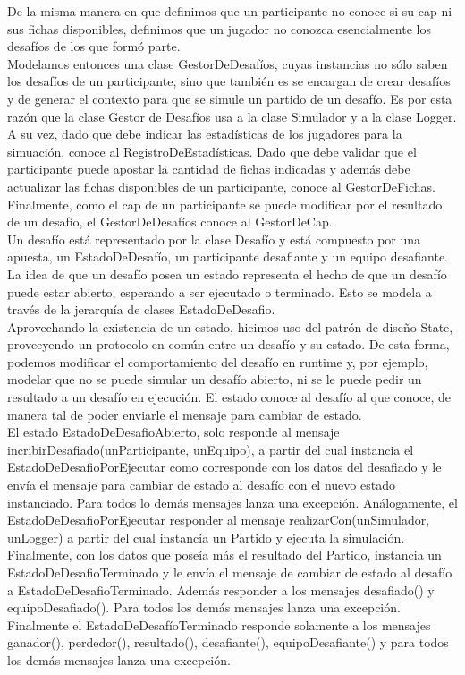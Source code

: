 De la misma manera en que definimos que un participante no conoce si su cap ni sus fichas disponibles, definimos que un jugador no conozca esencialmente los desafíos de los que formó parte.\\
Modelamos entonces una clase GestorDeDesafíos, cuyas instancias no sólo saben los desafíos de un participante, sino que también es se encargan de crear desafíos y de generar el contexto para que se simule un partido de un desafío. Es por esta razón que la clase Gestor de Desafíos usa a la clase Simulador y a la clase Logger.
A su vez, dado que debe indicar las estadísticas de los jugadores para la simuación, conoce al RegistroDeEstadísticas. Dado que debe validar que el participante puede apostar la cantidad de fichas indicadas y además debe actualizar las fichas disponibles de un participante, conoce al GestorDeFichas. Finalmente, como el cap de un participante se puede modificar por el resultado de un desafío, el GestorDeDesafíos conoce al GestorDeCap.\\

Un desafío está representado por la clase Desafío y está compuesto por una apuesta, un EstadoDeDesafío, un participante desafiante y un equipo desafiante.\\
La idea de que un desafío posea un estado representa el hecho de que un desafío puede estar abierto, esperando a ser ejecutado o terminado. Esto se modela a través de la jerarquía de clases EstadoDeDesafio.\\
Aprovechando la existencia de un estado, hicimos uso del patrón de diseño State, proveeyendo un protocolo en común entre un desafío y su estado. De esta forma, podemos modificar el comportamiento del desafío en runtime y, por ejemplo, modelar que no se puede simular un desafío abierto, ni se le puede pedir un resultado a un desafío en ejecución. El estado conoce al desafío al que conoce, de manera tal de poder enviarle el mensaje para cambiar de estado.\\
El estado EstadoDeDesafioAbierto, solo responde al mensaje incribirDesafiado(unParticipante, unEquipo), a partir del cual instancia el EstadoDeDesafioPorEjecutar como corresponde con los datos del desafiado y le envía el mensaje para cambiar de estado al desafío con el nuevo estado instanciado. Para todos lo demás mensajes lanza una excepción.
Análogamente, el EstadoDeDesafioPorEjecutar responder al mensaje realizarCon(unSimulador, unLogger) a partir del cual instancia un Partido y ejecuta la simulación. Finalmente, con los datos que poseía más el resultado del Partido, instancia un EstadoDeDesafioTerminado y le envía el mensaje de cambiar de estado al desafío a EstadoDeDesafioTerminado. Además responder a los mensajes desafiado() y equipoDesafiado(). Para todos los demás mensajes lanza una excepción.
Finalmente el EstadoDeDesafíoTerminado responde solamente a los mensajes ganador(), perdedor(), resultado(), desafiante(), equipoDesafiante() y para todos los demás mensajes lanza una excepción.

